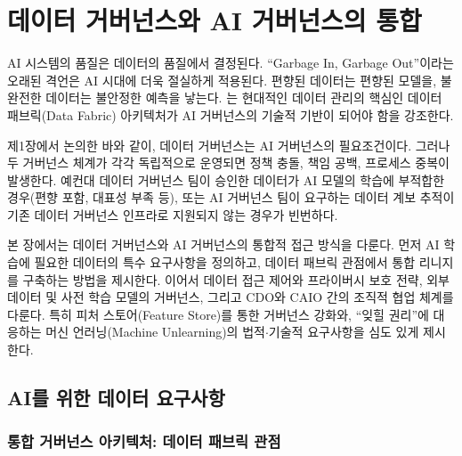 
\chapter{데이터 거버넌스와 AI 거버넌스의 통합}
\label{ch:data_ai_governance}

AI 시스템의 품질은 데이터의 품질에서 결정된다\cite{sambasivan2021everyone}. ``Garbage In, Garbage Out''이라는 오래된 격언은 AI 시대에 더욱 절실하게 적용된다. 편향된 데이터는 편향된 모델을, 불완전한 데이터는 불안정한 예측을 낳는다. \cite{gartner2021datafabric}는 현대적인 데이터 관리의 핵심인 데이터 패브릭(Data Fabric) 아키텍처가 AI 거버넌스의 기술적 기반이 되어야 함을 강조한다.

제1장에서 논의한 바와 같이, 데이터 거버넌스는 AI 거버넌스의 필요조건이다. 그러나 두 거버넌스 체계가 각각 독립적으로 운영되면 정책 충돌, 책임 공백, 프로세스 중복\cite{schneider2022governance}이 발생한다. 예컨대 데이터 거버넌스 팀이 승인한 데이터가 AI 모델의 학습에 부적합한 경우(편향 포함, 대표성 부족 등), 또는 AI 거버넌스 팀이 요구하는 데이터 계보\cite{wilkinson2016fair} 추적이 기존 데이터 거버넌스 인프라로 지원되지 않는 경우가 빈번하다.

본 장에서는 데이터 거버넌스와 AI 거버넌스의 통합적 접근 방식을 다룬다. 먼저 AI 학습에 필요한 데이터의 특수 요구사항을 정의하고, 데이터 패브릭 관점에서 통합 리니지를 구축하는 방법을 제시한다. 이어서 데이터 접근 제어\cite{abadi2016deep}와 프라이버시 보호 전략, 외부 데이터 및 사전 학습 모델\cite{bommasani2021opportunities}의 거버넌스, 그리고 CDO\cite{ladley2019data}와 CAIO 간의 조직적 협업 체계를 다룬다. 특히 피처 스토어(Feature Store)를 통한 거버넌스 강화와, ``잊힐 권리''에 대응하는 머신 언러닝\cite{bourtoule2021unlearning}(Machine Unlearning)의 법적$\cdot$기술적 요구사항을 심도 있게 제시한다.

\section{AI를 위한 데이터 요구사항}
\label{sec:9.1}

\subsection{통합 거버넌스 아키텍처: 데이터 패브릭 관점}
\label{sec:9.1.1}


